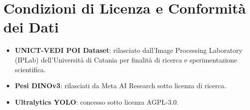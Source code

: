 \section{Condizioni di Licenza e Conformità dei Dati}
\label{sec:app_licenze}
\begin{itemize}
    \item \textbf{UNICT-VEDI POI Dataset}: rilasciato dall'Image Processing Laboratory (IPLab) dell'Università di Catania per finalità di ricerca e sperimentazione scientifica.
    \item \textbf{Pesi DINOv3}: rilasciati da Meta AI Research sotto licenza di ricerca.
    \item \textbf{Ultralytics YOLO}: concesso sotto licenza AGPL-3.0.
\end{itemize}
